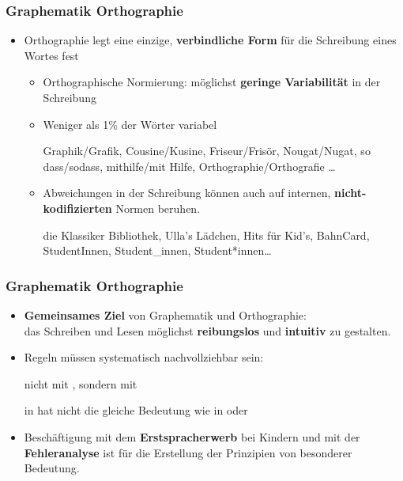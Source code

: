 \begin{frame}
\frametitle{Graphematik \vs Orthographie}

\begin{itemize}
	\item Orthographie legt \idR eine einzige, \textbf{verbindliche Form} für die Schreibung eines Wortes fest
	
	\begin{itemize}
		\item Orthographische Normierung: möglichst \textbf{geringe Variabilität} in der Schreibung

\pause

		\item Weniger als 1\% der Wörter variabel
			
		\ea Graphik/Grafik, Cousine/Kusine, Friseur/Frisör, Nougat/Nugat, so dass/sodass, mithilfe/mit Hilfe, Orthographie/Orthografie \dots
		\z

\pause 
			
		\item Abweichungen in der Schreibung können auch auf internen, \textbf{nicht-kodifizierten} Normen beruhen.
			
		\ea die Klassiker Bibliothek, Ulla's Lädchen, Hits für Kid's, BahnCard, StudentInnen, Student\_innen, Student*innen\dots
		\z
	\end{itemize}
\end{itemize}

\end{frame}


\begin{frame}
\frametitle{Graphematik \vs Orthographie}

\begin{itemize}
	\item \textbf{Gemeinsames Ziel} von Graphematik und Orthographie:\\
	 das Schreiben und Lesen möglichst \textbf{reibungslos} und \textbf{intuitiv} zu gestalten.

	\item Regeln müssen systematisch nachvollziehbar sein:
	
	\ea {} nicht mit , sondern mit  
	
	 in  hat nicht die gleiche Bedeutung wie  in  oder 
	\z
	
	\item Beschäftigung mit dem \textbf{Erstspracherwerb} bei Kindern und mit der \textbf{Fehleranalyse} ist für die Erstellung der Prinzipien von besonderer Bedeutung.
\end{itemize}

\end{frame}


